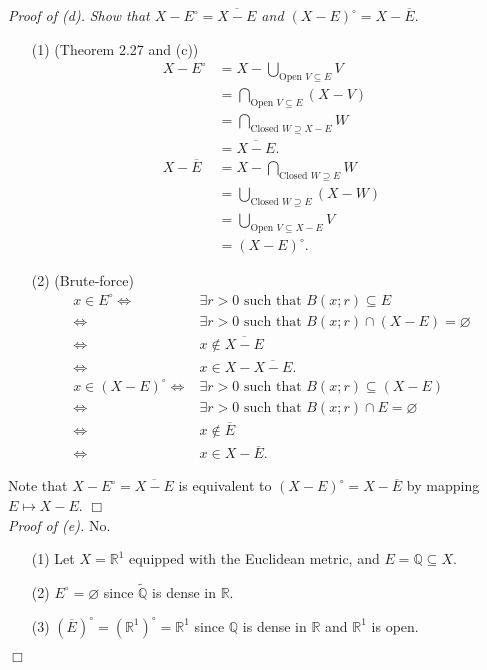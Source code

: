 \documentclass{article}
\begin{document}
\emph{Proof of (d).}
\emph{Show that
$X - E^{\circ} = \overline{X - E}$ and
$(X-E)^{\circ} = X - \overline{E}.$}
\begin{enumerate}
\item[(1)]
(Theorem 2.27 and (c))
\begin{align*}
X - E^{\circ}
&= X - \bigcup_{\text{Open } V \subseteq E} V \\
&= \bigcap_{\text{Open } V \subseteq E} (X - V) \\
&= \bigcap_{\text{Closed } W \supseteq X-E} W \\
&= \overline{X - E}. \\
X - \overline{E}
&= X - \bigcap_{\text{Closed } W \supseteq E} W \\
&= \bigcup_{\text{Closed } W \supseteq E} (X - W) \\
&= \bigcup_{\text{Open } V \subseteq X-E} V \\
&= (X - E)^{\circ}.
\end{align*}
\item[(2)]
(Brute-force)
\begin{align*}
x \in E^{\circ}
\Longleftrightarrow&
\exists r > 0 \text{ such that } B(x;r) \subseteq E \\
\Longleftrightarrow&
\exists r > 0 \text{ such that } B(x;r) \cap (X-E) = \varnothing \\
\Longleftrightarrow&
x \not\in \overline{X-E} \\
\Longleftrightarrow&
x \in X - \overline{X-E}. \\
x \in (X-E)^{\circ}
\Longleftrightarrow&
\exists r > 0 \text{ such that } B(x;r) \subseteq (X-E) \\
\Longleftrightarrow&
\exists r > 0 \text{ such that } B(x;r) \cap E = \varnothing \\
\Longleftrightarrow&
x \not\in \overline{E} \\
\Longleftrightarrow&
x \in X - \overline{E}.
\end{align*}
\end{enumerate}
Note that $X - E^{\circ} = \overline{X - E}$ is equivalent to
$(X-E)^{\circ} = X - \overline{E}$ by mapping $E \mapsto X-E$.
$\Box$ \\

\emph{Proof of (e).}
No.
\begin{enumerate}
\item[(1)]
Let $X = \mathbb{R}^1$ equipped with the Euclidean metric, and $E = \mathbb{Q} \subseteq X$.
\item[(2)]
$E^\circ = \varnothing$ since $\widetilde{\mathbb{Q}}$ is dense in $\mathbb{R}$.
\item[(3)]
$(\overline{E})^{\circ} = (\mathbb{R}^1)^{\circ} = \mathbb{R}^1$
since $\mathbb{Q}$ is dense in $\mathbb{R}$ and $\mathbb{R}^1$ is open.
\end{enumerate}
$\Box$ \\
\end{document}
